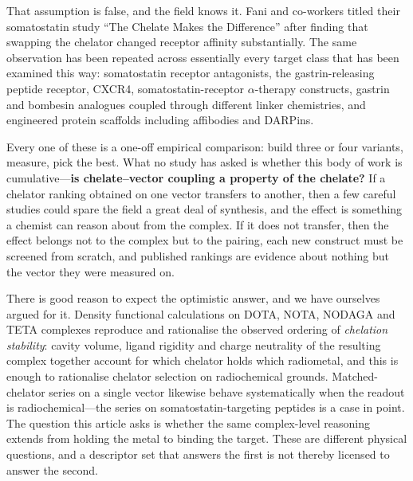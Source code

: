 That assumption is false, and the field knows it. Fani and co-workers titled their somatostatin study ``The Chelate Makes the Difference'' after finding that swapping the chelator changed receptor affinity substantially.\cite{Fani2011} The same observation has been repeated across essentially every target class that has been examined this way: somatostatin receptor antagonists,\cite{Nicolas2018,Fani2021,Zhang2024JR11} the gastrin-releasing peptide receptor,\cite{Varasteh2015,Abouzayed2019,Guenther2022,Abouzayed2023,Bodei2025,Mitran2016,Mitran2019} CXCR4,\cite{Poschenrieder2016a,Poschenrieder2020,Osl2020} somatostatin-receptor $\alpha$-therapy constructs,\cite{Stallons2022} gastrin and bombesin analogues coupled through different linker chemistries,\cite{Maina2018,Greifenstein2021} and engineered protein scaffolds including affibodies and DARPins.\cite{Rinne2019b,Oroujeni2025,Krasniqi2024}

Every one of these is a one-off empirical comparison: build three or four variants, measure, pick the best. What no study has asked is whether this body of work is cumulative---\textbf{is chelate--vector coupling a property of the chelate?} If a chelator ranking obtained on one vector transfers to another, then a few careful studies could spare the field a great deal of synthesis, and the effect is something a chemist can reason about from the complex. If it does not transfer, then the effect belongs not to the complex but to the pairing, each new construct must be screened from scratch, and published rankings are evidence about nothing but the vector they were measured on.

There is good reason to expect the optimistic answer, and we have ourselves argued for it. Density functional calculations on DOTA, NOTA, NODAGA and TETA complexes reproduce and rationalise the observed ordering of \emph{chelation stability}: cavity volume, ligand rigidity and charge neutrality of the resulting complex together account for which chelator holds which radiometal, and this is enough to rationalise chelator selection on radiochemical grounds.\cite{Kim2026ChelatorDFT} Matched-chelator series on a single vector likewise behave systematically when the readout is radiochemical---the  series on somatostatin-targeting peptides is a case in point.\cite{Kim2026PbSSTR2} The question this article asks is whether the same complex-level reasoning extends from holding the metal to binding the target. These are different physical questions, and a descriptor set that answers the first is not thereby licensed to answer the second.

